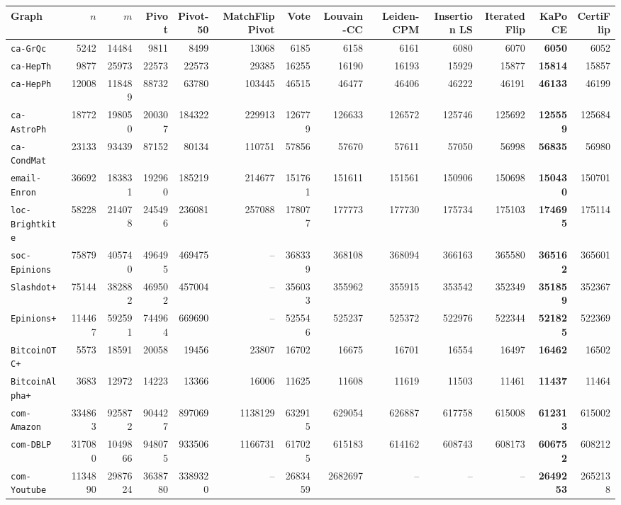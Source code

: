 \begin{tabular}{lrrrrrrrrrrrr}
\toprule
Graph & $n$ & $m$ & Pivot & Pivot-50 & MatchFlipPivot & Vote & Louvain-CC & Leiden-CPM & Insertion LS & IteratedFlip & KaPoCE & CertiFlip\\
\midrule
\texttt{ca-GrQc} & 5242 & 14484 & 9811 & 8499 & 13068 & 6185 & 6158 & 6161 & 6080 & 6070 & \textbf{6050} & 6052\\
\texttt{ca-HepTh} & 9877 & 25973 & 22573 & 22573 & 29385 & 16255 & 16190 & 16193 & 15929 & 15877 & \textbf{15814} & 15857\\
\texttt{ca-HepPh} & 12008 & 118489 & 88732 & 63780 & 103445 & 46515 & 46477 & 46406 & 46222 & 46191 & \textbf{46133} & 46199\\
\texttt{ca-AstroPh} & 18772 & 198050 & 200307 & 184322 & 229913 & 126779 & 126633 & 126572 & 125746 & 125692 & \textbf{125559} & 125684\\
\texttt{ca-CondMat} & 23133 & 93439 & 87152 & 80134 & 110751 & 57856 & 57670 & 57611 & 57050 & 56998 & \textbf{56835} & 56980\\
\texttt{email-Enron} & 36692 & 183831 & 192960 & 185219 & 214677 & 151761 & 151611 & 151561 & 150906 & 150698 & \textbf{150430} & 150701\\
\texttt{loc-Brightkite} & 58228 & 214078 & 245496 & 236081 & 257088 & 178077 & 177773 & 177730 & 175734 & 175103 & \textbf{174695} & 175114\\
\texttt{soc-Epinions} & 75879 & 405740 & 496495 & 469475 & -- & 368339 & 368108 & 368094 & 366163 & 365580 & \textbf{365162} & 365601\\
\texttt{Slashdot+} & 75144 & 382882 & 469502 & 457004 & -- & 356033 & 355962 & 355915 & 353542 & 352349 & \textbf{351859} & 352367\\
\texttt{Epinions+} & 114467 & 592591 & 744964 & 669690 & -- & 525546 & 525237 & 525372 & 522976 & 522344 & \textbf{521825} & 522369\\
\texttt{BitcoinOTC+} & 5573 & 18591 & 20058 & 19456 & 23807 & 16702 & 16675 & 16701 & 16554 & 16497 & \textbf{16462} & 16502\\
\texttt{BitcoinAlpha+} & 3683 & 12972 & 14223 & 13366 & 16006 & 11625 & 11608 & 11619 & 11503 & 11461 & \textbf{11437} & 11464\\
\texttt{com-Amazon} & 334863 & 925872 & 904427 & 897069 & 1138129 & 632915 & 629054 & 626887 & 617758 & 615008 & \textbf{612313} & 615002\\
\texttt{com-DBLP} & 317080 & 1049866 & 948075 & 933506 & 1166731 & 617025 & 615183 & 614162 & 608743 & 608173 & \textbf{606752} & 608212\\
\texttt{com-Youtube} & 1134890 & 2987624 & 3638780 & 3389320 & -- & 2683459 & 2682697 & -- & -- & -- & \textbf{2649253} & 2652138\\
\bottomrule
\end{tabular}

